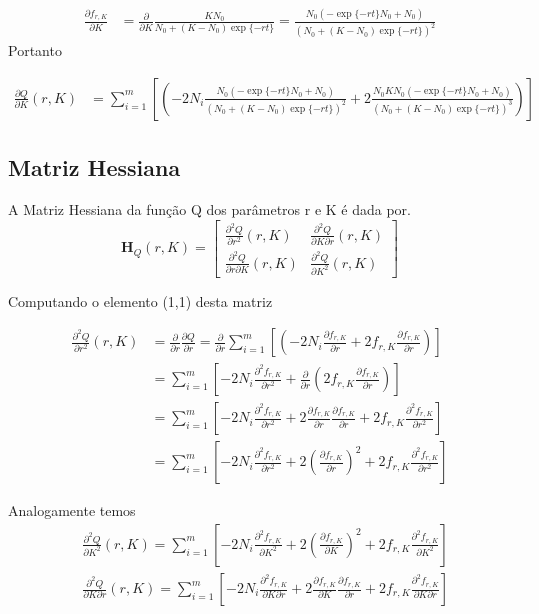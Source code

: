 \documentclass[a4paper,12pt,twoside]{article}
\begin{document}
\begin{align*}
\frac{\partial  f_{r,K}}{\partial K}&=\frac{\partial}{\partial K}\frac{KN_0}{N_0 + (K-N_0)\exp{\{-rt\}}}=\frac{N_0(-\exp{\{-rt\}}N_0+N_0)}{(N_0+(K-N_0)\exp{\{-rt\}})^2}
\end{align*}
Portanto

\begin{align*}
\frac{\partial Q}{\partial K}(r,K)&= \sum_{i=1}^{m}\left[(-2N_i\frac{N_0(-\exp{\{-rt\}}N_0+N_0)}{(N_0+(K-N_0)\exp{\{-rt\}})^2} + 2\frac{N_0 K N_0(-\exp{\{-rt\}}N_0+N_0)}{(N_0+(K-N_0)\exp{\{-rt\}})^3} ) \right]
\end{align*}

\subsection{Matriz Hessiana}
A Matriz Hessiana da função Q dos parâmetros r e K é dada por.
\begin{equation}
\bm{H}_{Q}(r,K)=\begin{bmatrix}
\frac{\partial^2Q }{\partial r^2}(r,K) &\frac{\partial^2Q }{\partial K \partial r}(r,K) \\ 
\frac{\partial^2Q }{\partial r \partial K}(r,K) & \frac{\partial^2Q }{\partial K^2}(r,K)
\end{bmatrix}
\end{equation}

Computando o elemento (1,1) desta matriz

\begin{align*}
\frac{\partial^2 Q}{\partial r^2}(r,K)&=\frac{\partial}{\partial r}\frac{\partial Q}{\partial r}=\frac{\partial}{\partial r} \sum_{i=1}^{m}\left[(-2N_i\frac{\partial  f_{r,K}}{\partial r} + 2f_{r,K}\frac{\partial  f_{r,K}}{\partial r} ) \right]\\
&= \sum_{i=1}^{m}\left[-2N_i\frac{\partial^2  f_{r,K}}{\partial r^2} + \frac{\partial}{\partial r}\left( 2f_{r,K}\frac{\partial  f_{r,K}}{\partial r}\right)  \right]\\
&= \sum_{i=1}^{m}\left[-2N_i\frac{\partial^2  f_{r,K}}{\partial r^2} + 2\frac{\partial f_{r,K}}{\partial r}\frac{\partial f_{r,K}}{\partial r} + 2 f_{r,K}\frac{\partial^2 f_{r,K}}{\partial r^2} \right]\\
&= \sum_{i=1}^{m}\left[-2N_i\frac{\partial^2  f_{r,K}}{\partial r^2} + 2\left(\frac{\partial f_{r,K}}{\partial r}\right)^2 + 2 f_{r,K}\frac{\partial^2 f_{r,K}}{\partial r^2} \right]
\end{align*}

Analogamente temos 
\begin{align*}
&\frac{\partial^2 Q}{\partial K^2}(r,K)= \sum_{i=1}^{m}\left[-2N_i\frac{\partial^2  f_{r,K}}{\partial K^2} + 2\left(\frac{\partial f_{r,K}}{\partial K}\right)^2 + 2 f_{r,K}\frac{\partial^2 f_{r,K}}{\partial K^2} \right]\\
&\frac{\partial^2 Q}{\partial K \partial r}(r,K)= \sum_{i=1}^{m}\left[-2N_i\frac{\partial^2  f_{r,K}}{\partial K \partial r} + 2\frac{\partial f_{r,K}}{\partial K}\frac{\partial f_{r,K}}{\partial r} + 2 f_{r,K}\frac{\partial^2 f_{r,K}}{\partial K \partial r} \right]
\end{align*}
\end{document}
